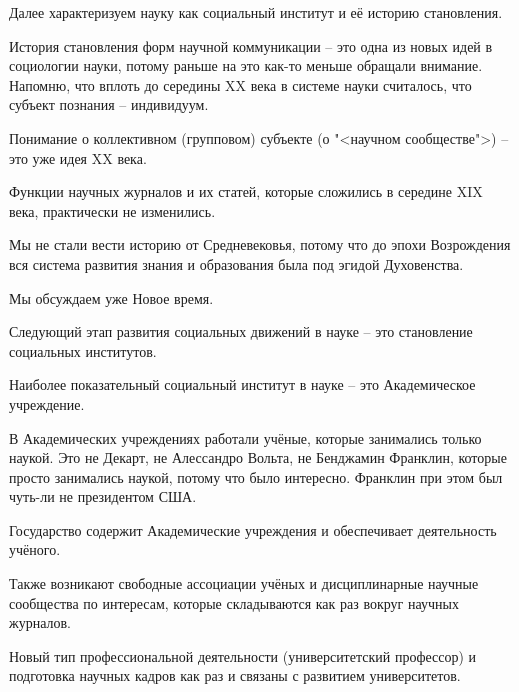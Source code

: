 \documentclass[main.tex]{subfiles}
\begin{document}


Далее характеризуем науку как социальный институт и её историю становления.



История становления форм научной коммуникации -- это одна из новых идей в социологии науки, потому раньше на это как-то меньше обращали внимание.
Напомню, что вплоть до середины XX века в системе науки считалось, что субъект познания -- индивидуум.

Понимание о коллективном (групповом) субъекте (о "<научном сообществе">) -- это уже идея XX века.


Функции научных журналов и их статей, которые сложились в середине XIX века, практически не изменились.

Мы не стали вести историю от Средневековья, потому что до эпохи Возрождения вся система развития знания и образования была под эгидой Духовенства.

Мы обсуждаем уже Новое время.



Следующий этап развития социальных движений в науке -- это становление социальных институтов.

Наиболее показательный социальный институт в науке -- это Академическое учреждение.

В Академических учреждениях работали учёные, которые занимались только наукой.
Это не Декарт, не Алессандро Вольта, не Бенджамин Франклин, которые просто занимались наукой, потому что было интересно.
Франклин при этом был чуть-ли не президентом США.

Государство содержит Академические учреждения и обеспечивает деятельность учёного.

Также возникают свободные ассоциации учёных и дисциплинарные научные сообщества по интересам, которые складываются как раз вокруг научных журналов.

Новый тип профессиональной деятельности (университетский профессор) и подготовка научных кадров как раз и связаны с развитием университетов.

\end{document}
